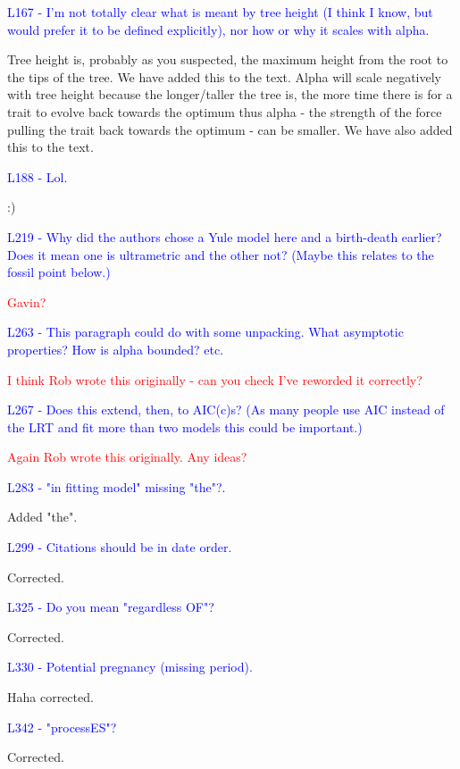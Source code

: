 \documentclass[12pt]{letter}
\begin{document}
\begin{letter}{}
\textcolor{blue}{L167 - I'm not totally clear what is meant by tree height (I think I know, but would prefer it to be defined explicitly), nor how or why it scales with alpha.}

Tree height is, probably as you suspected, the maximum height from the root to the tips of the tree. We have added this to the text. Alpha will scale negatively with tree height because the longer/taller the tree is, the more time there is for a trait to evolve back towards the optimum thus alpha - the strength of the force pulling the trait back towards the optimum - can be smaller. We have also added this to the text.

\textcolor{blue}{L188 - Lol.}

:)

\textcolor{blue}{L219 - Why did the authors chose a Yule model here and a birth-death earlier? Does it mean one is ultrametric and the other not? (Maybe this relates to the fossil point below.)}

\textcolor{red}{Gavin?}

\textcolor{blue}{L263 - This paragraph could do with some unpacking. What asymptotic properties? How is alpha bounded? etc.}

\textcolor{red}{I think Rob wrote this originally - can you check I've reworded it correctly?}

\textcolor{blue}{L267 - Does this extend, then, to AIC(c)s? (As many people use AIC instead of the LRT and fit more than two models this could be important.)}

\textcolor{red}{Again Rob wrote this originally. Any ideas?}

\textcolor{blue}{L283 - "in fitting model" missing "the"?.}

Added "the".

\textcolor{blue}{L299 - Citations should be in date order.}

Corrected.

\textcolor{blue}{L325 - Do you mean "regardless OF"?}

Corrected.

\textcolor{blue}{L330 - Potential pregnancy (missing period).}

Haha corrected.

\textcolor{blue}{L342 - "processES"?}

Corrected.


\end{letter}
\end{document}
